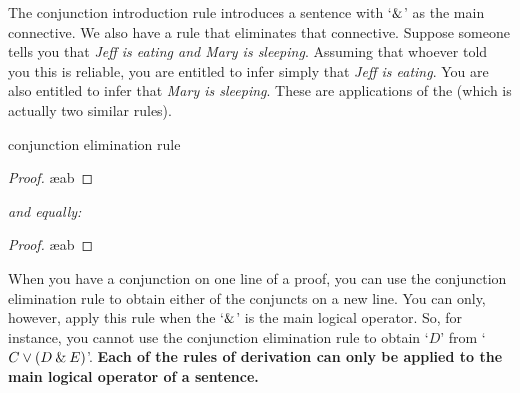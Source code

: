 The conjunction introduction rule introduces a sentence with `$\mathbin{\&}$' as the main connective. We also have a rule that eliminates that connective. Suppose someone tells you that \textit{Jeff is eating and Mary is sleeping}. Assuming that whoever told you this is reliable, you are entitled to infer simply that \textit{Jeff is eating}. You are also entitled to infer that \textit{Mary is sleeping}. These are applications of the  (which is actually two similar rules).

\begin{factboxy-width}[width=7.5cm]{conjunction elimination rule}
\begin{proof}
	 \ae{ab}
\end{proof}
\textit{and equally:}
\begin{proof}
	 \ae{ab}
\end{proof}
\end{factboxy-width}
\noindent When you have a conjunction on one line of a proof, you can use the conjunction elimination rule to obtain either of the conjuncts on a new line. You can only, however, apply this rule when the `$\mathbin{\&}$' is the main logical operator. So, for instance, you cannot use the conjunction elimination rule to obtain `$D$' from `$C \vee (D \mathbin{\&} E)$'. \textbf{Each of the rules of derivation can only be applied to the main logical operator of a sentence.}

